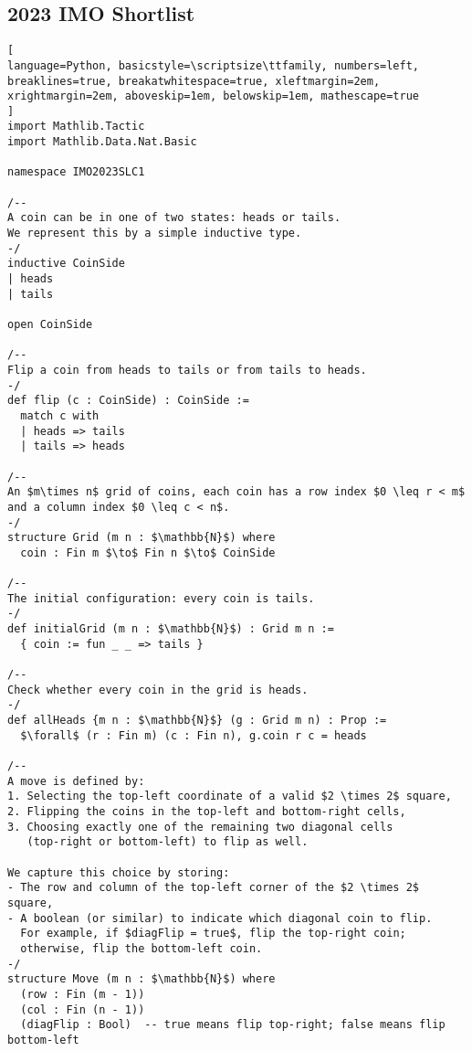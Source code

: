 \subsection*{2023 IMO Shortlist}
\begin{tcolorbox}[enhanced, breakable, rounded corners,
    colback=green!5!white, colframe=green!75!black,
    colbacktitle=green!85!black, fonttitle=\bfseries, coltitle=white, title=Lean Theorem for 2023 IMO Shortlist Combinatorics Problem 1]
\setlength{\parskip}{1em}
\begin{lstlisting}[
language=Python, basicstyle=\scriptsize\ttfamily, numbers=left, breaklines=true, breakatwhitespace=true, xleftmargin=2em, xrightmargin=2em, aboveskip=1em, belowskip=1em, mathescape=true
]
import Mathlib.Tactic
import Mathlib.Data.Nat.Basic

namespace IMO2023SLC1

/--
A coin can be in one of two states: heads or tails.
We represent this by a simple inductive type.
-/
inductive CoinSide
| heads
| tails

open CoinSide

/--
Flip a coin from heads to tails or from tails to heads.
-/
def flip (c : CoinSide) : CoinSide :=
  match c with
  | heads => tails
  | tails => heads

/--
An $m\times n$ grid of coins, each coin has a row index $0 \leq r < m$
and a column index $0 \leq c < n$.
-/
structure Grid (m n : $\mathbb{N}$) where
  coin : Fin m $\to$ Fin n $\to$ CoinSide

/--
The initial configuration: every coin is tails.
-/
def initialGrid (m n : $\mathbb{N}$) : Grid m n :=
  { coin := fun _ _ => tails }

/--
Check whether every coin in the grid is heads.
-/
def allHeads {m n : $\mathbb{N}$} (g : Grid m n) : Prop :=
  $\forall$ (r : Fin m) (c : Fin n), g.coin r c = heads

/--
A move is defined by:
1. Selecting the top-left coordinate of a valid $2 \times 2$ square,
2. Flipping the coins in the top-left and bottom-right cells,
3. Choosing exactly one of the remaining two diagonal cells
   (top-right or bottom-left) to flip as well.

We capture this choice by storing:
- The row and column of the top-left corner of the $2 \times 2$ square,
- A boolean (or similar) to indicate which diagonal coin to flip.
  For example, if $diagFlip = true$, flip the top-right coin;
  otherwise, flip the bottom-left coin.
-/
structure Move (m n : $\mathbb{N}$) where
  (row : Fin (m - 1))
  (col : Fin (n - 1))
  (diagFlip : Bool)  -- true means flip top-right; false means flip bottom-left


\end{lstlisting}
\end{tcolorbox}
